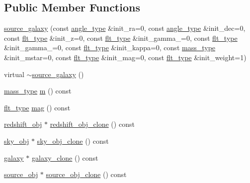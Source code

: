 \subsection*{Public Member Functions}
\begin{DoxyCompactItemize}
\item 
\hyperlink{classIceBRG_1_1source__galaxy_a4c686c1b8886eeb4a63159e2e8f78c24}{source\+\_\+galaxy} (const \hyperlink{namespaceIceBRG_a688eeb0811a2474b20b667ed2e9625a1}{angle\+\_\+type} \&init\+\_\+ra=0, const \hyperlink{namespaceIceBRG_a688eeb0811a2474b20b667ed2e9625a1}{angle\+\_\+type} \&init\+\_\+dec=0, const \hyperlink{lib_2IceBRG__main_2common_8h_ad0f130a56eeb944d9ef2692ee881ecc4}{flt\+\_\+type} \&init\+\_\+z=0, const \hyperlink{lib_2IceBRG__main_2common_8h_ad0f130a56eeb944d9ef2692ee881ecc4}{flt\+\_\+type} \&init\+\_\+gamma\+\_=0, const \hyperlink{lib_2IceBRG__main_2common_8h_ad0f130a56eeb944d9ef2692ee881ecc4}{flt\+\_\+type} \&init\+\_\+gamma\+\_=0, const \hyperlink{lib_2IceBRG__main_2common_8h_ad0f130a56eeb944d9ef2692ee881ecc4}{flt\+\_\+type} \&init\+\_\+kappa=0, const \hyperlink{namespaceIceBRG_a1be72ac4918a9b029f2eefa084213e35}{mass\+\_\+type} \&init\+\_\+mstar=0, const \hyperlink{lib_2IceBRG__main_2common_8h_ad0f130a56eeb944d9ef2692ee881ecc4}{flt\+\_\+type} \&init\+\_\+mag=0, const \hyperlink{lib_2IceBRG__main_2common_8h_ad0f130a56eeb944d9ef2692ee881ecc4}{flt\+\_\+type} \&init\+\_\+weight=1)
\item 
virtual \hyperlink{classIceBRG_1_1source__galaxy_a7da38db1eff5abdf349cf6eef319d93a}{$\sim$source\+\_\+galaxy} ()
\item 
\hyperlink{namespaceIceBRG_a1be72ac4918a9b029f2eefa084213e35}{mass\+\_\+type} \hyperlink{classIceBRG_1_1source__galaxy_a2892608eb586559a48b0c37702220f31}{m} () const 
\item 
\hyperlink{lib_2IceBRG__main_2common_8h_ad0f130a56eeb944d9ef2692ee881ecc4}{flt\+\_\+type} \hyperlink{classIceBRG_1_1source__galaxy_a33f22908e54b33a8a28603e1ddddd45d}{mag} () const 
\item 
\hyperlink{classIceBRG_1_1redshift__obj}{redshift\+\_\+obj} $\ast$ \hyperlink{classIceBRG_1_1source__galaxy_a59d08611112a2118f49ce569271524e7}{redshift\+\_\+obj\+\_\+clone} () const 
\item 
\hyperlink{classIceBRG_1_1sky__obj}{sky\+\_\+obj} $\ast$ \hyperlink{classIceBRG_1_1source__galaxy_abf946b4f026c3ff45bfd4909a34bbbd7}{sky\+\_\+obj\+\_\+clone} () const 
\item 
\hyperlink{classIceBRG_1_1galaxy}{galaxy} $\ast$ \hyperlink{classIceBRG_1_1source__galaxy_acd7fb2dea893e8f22e85f5e228b9aaba}{galaxy\+\_\+clone} () const 
\item 
\hyperlink{classIceBRG_1_1source__obj}{source\+\_\+obj} $\ast$ \hyperlink{classIceBRG_1_1source__galaxy_af44074baa972ef3d0ebc59aedd047459}{source\+\_\+obj\+\_\+clone} () const 
\end{DoxyCompactItemize}
